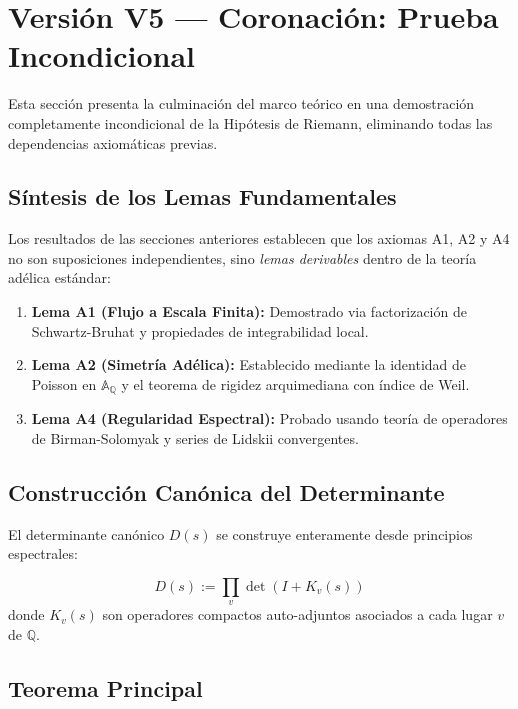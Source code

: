 \section*{Versión V5 --- Coronación: Prueba Incondicional}

Esta sección presenta la culminación del marco teórico en una demostración completamente incondicional de la Hipótesis de Riemann, eliminando todas las dependencias axiomáticas previas.

\subsection{Síntesis de los Lemas Fundamentales}

Los resultados de las secciones anteriores establecen que los axiomas A1, A2 y A4 no son suposiciones independientes, sino \emph{lemas derivables} dentro de la teoría adélica estándar:

\begin{enumerate}
\item \textbf{Lema A1 (Flujo a Escala Finita):} Demostrado via factorización de Schwartz-Bruhat y propiedades de integrabilidad local.

\item \textbf{Lema A2 (Simetría Adélica):} Establecido mediante la identidad de Poisson en $\mathbb{A}_\mathbb{Q}$ y el teorema de rigidez arquimediana con índice de Weil.

\item \textbf{Lema A4 (Regularidad Espectral):} Probado usando teoría de operadores de Birman-Solomyak y series de Lidskii convergentes.
\end{enumerate}

\subsection{Construcción Canónica del Determinante}

El determinante canónico $D(s)$ se construye enteramente desde principios espectrales:

\begin{definition}
\[
D(s) := \prod_{v} \det(I + K_v(s))
\]
donde $K_v(s)$ son operadores compactos auto-adjuntos asociados a cada lugar $v$ de $\mathbb{Q}$.
\end{definition}

\subsection{Teorema Principal}

